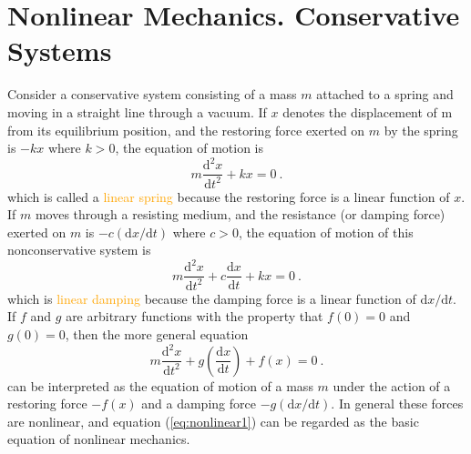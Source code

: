 \documentclass[12pt,a4paper]{article}
\newcommand{\dif}{\mathrm{d}}
\begin{document}
\section{Nonlinear Mechanics. Conservative Systems}
\cite{george1991differential, simmons2016differential} Consider a conservative system consisting of a mass $m$ attached to a spring and moving in a straight line through a vacuum. If $x$ denotes the displacement of m from its equilibrium position, and the restoring force exerted on $m$ by the spring is $-kx$ where $k > 0$, the equation of motion is
\begin{equation}
m \dfrac{\dif^2 x}{\dif t^2} +kx = 0~.
\end{equation}
which is called a \textcolor{orange}{linear spring} because the restoring force is a linear function of $x$. If $m$ moves through a resisting medium, and the resistance (or damping force) exerted on $m$ is $-c(\dif x/\dif t)$ where $c > 0$, the equation of motion of this nonconservative system is
\begin{equation}
m \dfrac{\dif^2 x}{\dif t^2} +c\dfrac{\dif x}{\dif t} +kx = 0 ~.
\end{equation}
which is \textcolor{orange}{linear damping} because the damping force is a linear function of $\dif x/\dif t$. If $f$ and $g$ are arbitrary functions with the property that $f(0) = 0$ and $g(0) = 0$, then the more general equation
\begin{equation}
m \dfrac{\dif^2 x}{\dif t^2} +g\left(\dfrac{\dif x}{\dif t}\right) +f(x) = 0 ~.
\label{eq:nonlinear1}
\end{equation}
can be interpreted as the equation of motion of a mass $m$ under the action of a restoring force $-f(x)$ and a damping force $-g(\dif x/\dif t)$. In general these forces are nonlinear, and equation (\ref{eq:nonlinear1}) can be regarded as the basic equation of nonlinear mechanics.
\end{document}
